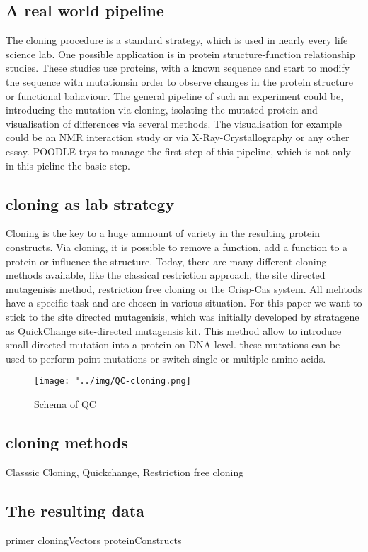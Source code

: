 \documentclass{bioinfo}
\begin{document}
\subsection{A real world pipeline}
The cloning procedure is a standard strategy, which is used in nearly every life science lab. One possible application is in protein structure-function relationship studies. These studies use proteins, with a known sequence and start to modify the sequence with mutationsin order to observe changes  in the protein structure or functional bahaviour. The general pipeline of such an experiment could be, introducing the mutation via cloning, isolating the mutated protein and visualisation of differences via several methods. The visualisation for example could be an NMR interaction study or via X-Ray-Crystallography or any other essay. POODLE trys to manage the first  step of this pipeline, which is not only in this pieline the basic step.
\subsection{cloning as lab strategy}
Cloning is the key to a huge ammount of variety in the resulting protein constructs. Via cloning, it is possible to remove a function, add a function to a protein or influence the structure. Today, there are many different cloning methods available, like the classical restriction approach, the site directed mutagenisis method, restriction free cloning or the Crisp-Cas system. All mehtods have a specific task and are chosen in various situation. For this paper we want to stick to the site directed mutagenisis, which was initially developed by stratagene as QuickChange site-directed mutagensis kit. This method allow to introduce small directed mutation into a protein on DNA level. these mutations can be used to perform point mutations or switch single or multiple amino acids.

\begin{figure}
	\texttt{[image: "../img/QC-cloning.png]}
	\caption{Schema of QC}
	\label{QC-pic}
\end{figure}

\subsection{cloning methods}
Classsic Cloning, Quickchange, Restriction free cloning

\subsection{The resulting data}
primer
cloningVectors
proteinConstructs
\end{document}
